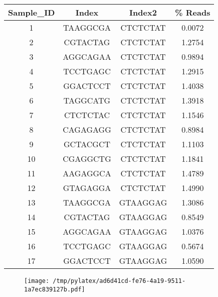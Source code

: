 \documentclass{article}
\begin{document}
\begin{figure}[htbp]
\begin{tabular}{c|c|c|c}
Sample\_ID&Index&Index2&\% Reads\\
\hline
1&TAAGGCGA&CTCTCTAT&0.0072\\
2&CGTACTAG&CTCTCTAT&1.2754\\
3&AGGCAGAA&CTCTCTAT&0.9894\\
4&TCCTGAGC&CTCTCTAT&1.2915\\
5&GGACTCCT&CTCTCTAT&1.4038\\
6&TAGGCATG&CTCTCTAT&1.3918\\
7&CTCTCTAC&CTCTCTAT&1.1546\\
8&CAGAGAGG&CTCTCTAT&0.8984\\
9&GCTACGCT&CTCTCTAT&1.1103\\
10&CGAGGCTG&CTCTCTAT&1.1841\\
11&AAGAGGCA&CTCTCTAT&1.4789\\
12&GTAGAGGA&CTCTCTAT&1.4990\\
13&TAAGGCGA&GTAAGGAG&1.3086\\
14&CGTACTAG&GTAAGGAG&0.8549\\
15&AGGCAGAA&GTAAGGAG&1.0376\\
16&TCCTGAGC&GTAAGGAG&0.5674\\
17&GGACTCCT&GTAAGGAG&1.0590\\
\end{tabular}
\begin{subfigure}{0.45\linewidth}
\texttt{[image: /tmp/pylatex/ad6d41cd-fe76-4a19-9511-1a7ec839127b.pdf]}
\end{subfigure}
\end{figure}
\end{document}
